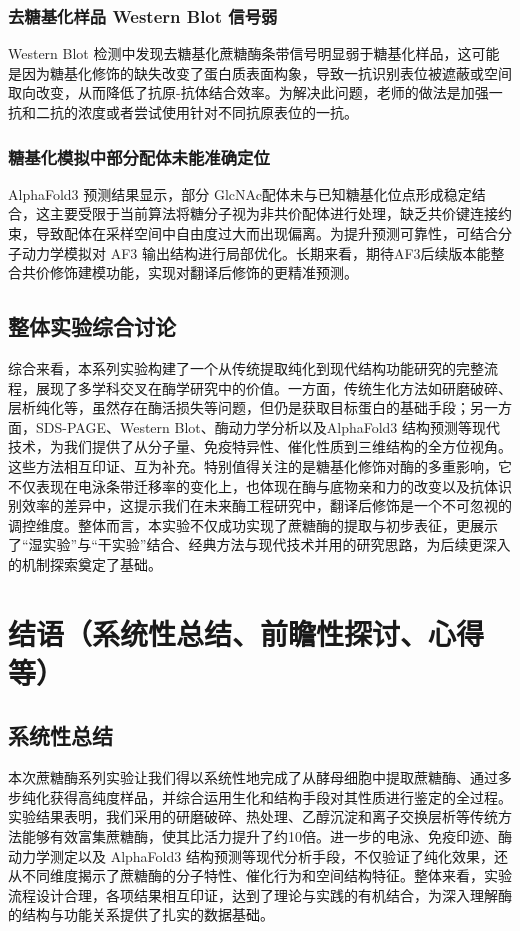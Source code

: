\documentclass[10.5pt, a4paper]{ctexart}
\begin{document}
\subsubsection{去糖基化样品 Western Blot 信号弱}
Western Blot 检测中发现去糖基化蔗糖酶条带信号明显弱于糖基化样品，这可能是因为糖基化修饰的缺失改变了蛋白质表面构象，导致一抗识别表位被遮蔽或空间取向改变，从而降低了抗原-抗体结合效率。为解决此问题，老师的做法是加强一抗和二抗的浓度或者尝试使用针对不同抗原表位的一抗。

\subsubsection{糖基化模拟中部分配体未能准确定位}
AlphaFold3 预测结果显示，部分 GlcNAc配体未与已知糖基化位点形成稳定结合，这主要受限于当前算法将糖分子视为非共价配体进行处理，缺乏共价键连接约束，导致配体在采样空间中自由度过大而出现偏离。为提升预测可靠性，可结合分子动力学模拟对 AF3 输出结构进行局部优化。长期来看，期待AF3后续版本能整合共价修饰建模功能，实现对翻译后修饰的更精准预测。

\subsection{整体实验综合讨论}
综合来看，本系列实验构建了一个从传统提取纯化到现代结构功能研究的完整流程，展现了多学科交叉在酶学研究中的价值。一方面，传统生化方法如研磨破碎、层析纯化等，虽然存在酶活损失等问题，但仍是获取目标蛋白的基础手段；另一方面，SDS-PAGE、Western Blot、酶动力学分析以及AlphaFold3 结构预测等现代技术，为我们提供了从分子量、免疫特异性、催化性质到三维结构的全方位视角。这些方法相互印证、互为补充。特别值得关注的是糖基化修饰对酶的多重影响，它不仅表现在电泳条带迁移率的变化上，也体现在酶与底物亲和力的改变以及抗体识别效率的差异中，这提示我们在未来酶工程研究中，翻译后修饰是一个不可忽视的调控维度。整体而言，本实验不仅成功实现了蔗糖酶的提取与初步表征，更展示了“湿实验”与“干实验”结合、经典方法与现代技术并用的研究思路，为后续更深入的机制探索奠定了基础。

\section{结语（系统性总结、前瞻性探讨、心得等）}

\subsection{系统性总结}
本次蔗糖酶系列实验让我们得以系统性地完成了从酵母细胞中提取蔗糖酶、通过多步纯化获得高纯度样品，并综合运用生化和结构手段对其性质进行鉴定的全过程。实验结果表明，我们采用的研磨破碎、热处理、乙醇沉淀和离子交换层析等传统方法能够有效富集蔗糖酶，使其比活力提升了约10倍。进一步的电泳、免疫印迹、酶动力学测定以及 AlphaFold3 结构预测等现代分析手段，不仅验证了纯化效果，还从不同维度揭示了蔗糖酶的分子特性、催化行为和空间结构特征。整体来看，实验流程设计合理，各项结果相互印证，达到了理论与实践的有机结合，为深入理解酶的结构与功能关系提供了扎实的数据基础。
\end{document}
